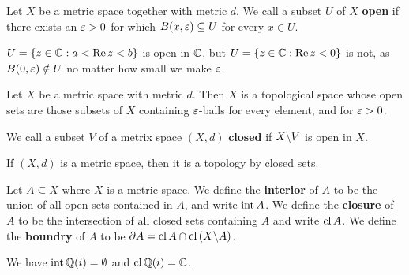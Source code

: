 \begin{definition}
     Let $X$ be a metric space together with metric $d$. We call a subset $U$ of
     $X$  \textbf{open} if there exists an $\varepsilon>0$ for which  $B(x,\varepsilon) \subseteq
     U$ for every $x \in U$.
\end{definition}

\begin{example}\label{example_2.2}
    $U=\{z \in \mathbb{C} : a< \operatorname{Re}{z}<b\}$ is open in $\mathbb{C}$, but  $U=\{z \in \mathbb{C} :
    \operatorname{Re}{z}<0\}$ is not, as $B(0,\varepsilon) \notin U$ no matter how small we make $\varepsilon$.
\end{example}

\begin{theorem}\label{2.1.1}
    Let $X$ be a metric space with metric  $d$. Then $X$ is a topological space
    whose open sets are those subsets of  $X$ containing $\varepsilon$-balls for every
    element, and for $\varepsilon>0$.
\end{theorem}

\begin{definition}
    We call a subset $V$ of a metrix space $(X,d)$ \textbf{closed} if
    $X \backslash V$ is open in $X$.
\end{definition}

\begin{lemma}\label{2.1.2}
    If $(X,d)$ is a metric space, then it is a topology by closed sets.
\end{lemma}

\begin{definition}
    Let $A \subseteq X$ where $X$ is a metric space. We define the
    \textbf{interior} of $A$ to be the union of all open sets contained in $A$,
    and write $\operatorname{int}{A}$. We define the \textbf{closure} of $A$ to be the
    intersection of all closed sets containing  $A$ and write  $\operatorname{cl}{A}$. We
    define the \textbf{boundry} of $A$ to be  $\partial{A}=\operatorname{cl}{A} \cap
    \operatorname{cl}{(X \backslash A)}$.
\end{definition}

\begin{example}\label{example_2.3}
    We have $\operatorname{int}{\mathbb{Q}(i)}=\emptyset$ and $\operatorname{cl}{\mathbb{Q}(i)}=\mathbb{C}$.
\end{example}

